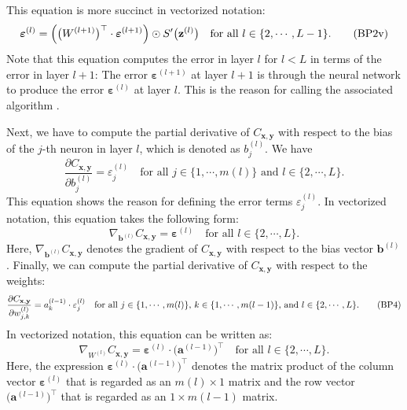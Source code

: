 This equation is more succinct in vectorized notation:
\begin{equation}
  \label{eq:BP2v}
  \boldsymbol{\varepsilon}^{(l)} = \Bigl(\bigl(W^{(l+1)}\bigr)^\top \cdot \boldsymbol{\varepsilon}^{(l+1)}\Bigr) \odot
  S'\bigl(\mathbf{z}^{(l)}\bigr) \quad \mbox{for all $l \in \{2, \cdots, L-1\}$}.
  \tag{BP2v}
\end{equation}
Note that this equation computes the error in layer $l$ for $l < L$ in terms
of the error in layer $l+1$:  The error 
$\boldsymbol{\varepsilon}^{(l+1)}$ at layer $l+1$ is  through the neural network to produce the
error $\boldsymbol{\varepsilon}^{(l)}$ at layer $l$.  This is the reason for calling the associated algorithm .

Next, we have to compute the partial derivative of $C_{\mathbf{x}, \mathbf{y}}$ with respect to the bias of the
$j$-th neuron in layer $l$, which is denoted as $b_j^{(l)}$.  We have
\begin{equation}
  \label{eq:BP3}
  \frac{\partial C_{\mathbf{x}, \mathbf{y}}}{\partial b_j^{(l)}} = \varepsilon_j^{(l)}
  \quad \mbox{for all $j \in \{1,\cdots,m(l)\}$ and $l \in \{2, \cdots,L\}$.}
  \tag{BP3}
\end{equation}
This equation shows the reason for defining the error terms $\varepsilon_j^{(l)}$.
In vectorized notation, this equation takes the following form:
\begin{equation}
  \label{eq:BP3v}
  \nabla_{\mathbf{b}^{(l)}} C_{\mathbf{x}, \mathbf{y}} = \boldsymbol{\varepsilon}^{(l)}
  \quad \mbox{for all $l \in \{2, \cdots,L\}$.}
  \tag{BP3v}
\end{equation}
Here, $\nabla_{\mathbf{b}^{(l)}} C_{\mathbf{x}, \mathbf{y}}$ denotes the gradient of $C_{\mathbf{x},
  \mathbf{y}}$ with respect to the bias vector $\mathbf{b}^{(l)}$.
Finally, we can compute the  partial derivative of $C_{\mathbf{x}, \mathbf{y}}$ with respect to the weights:
\begin{equation}
  \label{eq:BP4}
  \frac{\partial C_{\mathbf{x}, \mathbf{y}}}{\partial w_{j,k}^{(l)}} = a_k^{(l-1)} \cdot \varepsilon_j^{(l)}
  \quad \mbox{for all $j \in \{1,\cdots,m(l)\}$, $ k \in \{1,\cdots,m(l-1)\}$, and $l \in \{2, \cdots,L\}$.}
  \tag{BP4}
\end{equation}
In vectorized notation, this equation can be written as:
\begin{equation}
  \label{eq:BP4v}
  \nabla_{W^{(l)}} C_{\mathbf{x}, \mathbf{y}} = \boldsymbol{\varepsilon}^{(l)} \cdot \bigl(\mathbf{a}^{(l-1)}\bigr)^\top
  \quad \mbox{for all $l \in \{2, \cdots,L\}$.}
  \tag{BP4v}
\end{equation}
Here, the expression $\boldsymbol{\varepsilon}^{(l)} \cdot \bigl(\mathbf{a}^{(l-1)}\bigr)^\top$ denotes the matrix
product of the column vector $\boldsymbol{\varepsilon}^{(l)}$ that is regarded as an $m(l) \times 1$ matrix and the
row vector $\bigl(\mathbf{a}^{(l-1)}\bigr)^\top$ that is regarded as an $1 \times m(l-1)$ matrix.

